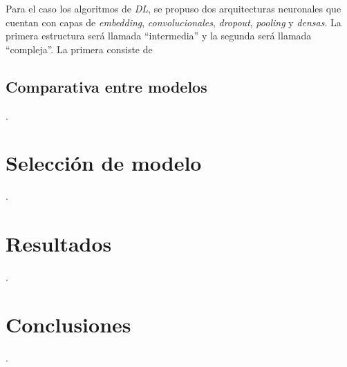 Para el caso los algoritmos de \textit{DL}, se propuso dos arquitecturas neuronales que cuentan con capas de \textit{embedding}, \textit{convolucionales}, \textit{dropout}, \textit{pooling} y \textit{densas}. La primera estructura será llamada “intermedia” y la segunda será llamada “compleja”. La primera consiste de 

\subsection{Comparativa entre modelos}

.

\section{Selección de modelo}
.

\section{Resultados}
.

\section{Conclusiones}
.



\newpage
	




